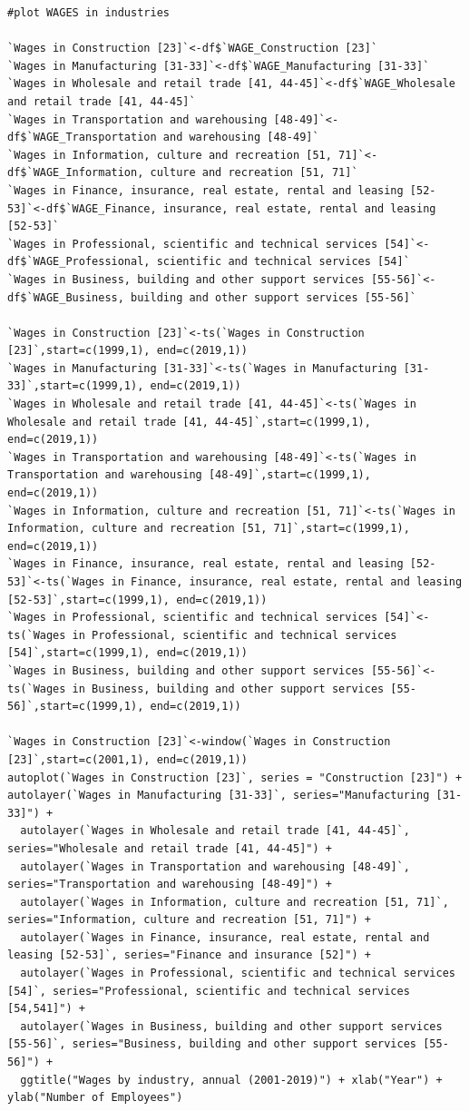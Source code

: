 \documentclass[12pt]{article}
\begin{document}
\begin{verbatim}
#plot WAGES in industries

`Wages in Construction [23]`<-df$`WAGE_Construction [23]`
`Wages in Manufacturing [31-33]`<-df$`WAGE_Manufacturing [31-33]`
`Wages in Wholesale and retail trade [41, 44-45]`<-df$`WAGE_Wholesale and retail trade [41, 44-45]`
`Wages in Transportation and warehousing [48-49]`<-df$`WAGE_Transportation and warehousing [48-49]`
`Wages in Information, culture and recreation [51, 71]`<-df$`WAGE_Information, culture and recreation [51, 71]`	
`Wages in Finance, insurance, real estate, rental and leasing [52-53]`<-df$`WAGE_Finance, insurance, real estate, rental and leasing [52-53]`
`Wages in Professional, scientific and technical services [54]`<-df$`WAGE_Professional, scientific and technical services [54]`
`Wages in Business, building and other support services [55-56]`<-df$`WAGE_Business, building and other support services [55-56]`

`Wages in Construction [23]`<-ts(`Wages in Construction [23]`,start=c(1999,1), end=c(2019,1))
`Wages in Manufacturing [31-33]`<-ts(`Wages in Manufacturing [31-33]`,start=c(1999,1), end=c(2019,1))
`Wages in Wholesale and retail trade [41, 44-45]`<-ts(`Wages in Wholesale and retail trade [41, 44-45]`,start=c(1999,1), end=c(2019,1))
`Wages in Transportation and warehousing [48-49]`<-ts(`Wages in Transportation and warehousing [48-49]`,start=c(1999,1), end=c(2019,1))
`Wages in Information, culture and recreation [51, 71]`<-ts(`Wages in Information, culture and recreation [51, 71]`,start=c(1999,1), end=c(2019,1))
`Wages in Finance, insurance, real estate, rental and leasing [52-53]`<-ts(`Wages in Finance, insurance, real estate, rental and leasing [52-53]`,start=c(1999,1), end=c(2019,1))
`Wages in Professional, scientific and technical services [54]`<-ts(`Wages in Professional, scientific and technical services [54]`,start=c(1999,1), end=c(2019,1))
`Wages in Business, building and other support services [55-56]`<-ts(`Wages in Business, building and other support services [55-56]`,start=c(1999,1), end=c(2019,1))

`Wages in Construction [23]`<-window(`Wages in Construction [23]`,start=c(2001,1), end=c(2019,1)) 
autoplot(`Wages in Construction [23]`, series = "Construction [23]") + autolayer(`Wages in Manufacturing [31-33]`, series="Manufacturing [31-33]") +
  autolayer(`Wages in Wholesale and retail trade [41, 44-45]`, series="Wholesale and retail trade [41, 44-45]") +
  autolayer(`Wages in Transportation and warehousing [48-49]`, series="Transportation and warehousing [48-49]") +
  autolayer(`Wages in Information, culture and recreation [51, 71]`, series="Information, culture and recreation [51, 71]") +
  autolayer(`Wages in Finance, insurance, real estate, rental and leasing [52-53]`, series="Finance and insurance [52]") +
  autolayer(`Wages in Professional, scientific and technical services [54]`, series="Professional, scientific and technical services [54,541]") +
  autolayer(`Wages in Business, building and other support services [55-56]`, series="Business, building and other support services [55-56]") +
  ggtitle("Wages by industry, annual (2001-2019)") + xlab("Year") + ylab("Number of Employees")


\end{verbatim}
\end{document}
